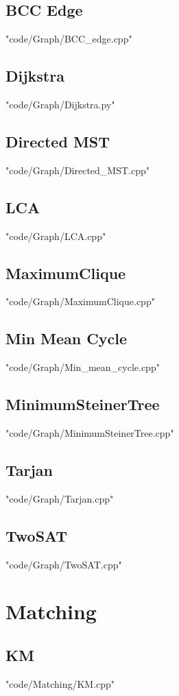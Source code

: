 \subsection{BCC Edge}
 {"code/Graph/BCC_edge.cpp"}
\subsection{Dijkstra}
 {"code/Graph/Dijkstra.py"}
\subsection{Directed MST}
 {"code/Graph/Directed_MST.cpp"}
\subsection{LCA}
 {"code/Graph/LCA.cpp"}
\subsection{MaximumClique}
 {"code/Graph/MaximumClique.cpp"}
\subsection{Min Mean Cycle}
 {"code/Graph/Min_mean_cycle.cpp"}
\subsection{MinimumSteinerTree}
 {"code/Graph/MinimumSteinerTree.cpp"}
\subsection{Tarjan}
 {"code/Graph/Tarjan.cpp"}
\subsection{TwoSAT}
 {"code/Graph/TwoSAT.cpp"}
\section{Matching}
\subsection{KM}
 {"code/Matching/KM.cpp"}
